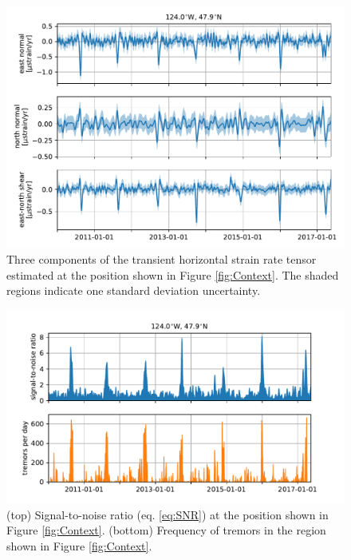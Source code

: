 \documentclass[10pt,letter]{article}
\begin{document}
\begin{figure}
\includegraphics{figures/strain_ts/strain-ts.pdf}
\caption{Three components of the transient horizontal strain rate tensor estimated at the position shown in Figure \ref{fig:Context}. The shaded regions indicate one standard deviation uncertainty.}   
\label{fig:StrainTs}
\end{figure}

\begin{figure}
\includegraphics{figures/strain_ts/mag-ts.pdf}
\caption{(top) Signal-to-noise ratio (eq. \ref{eq:SNR}) at the position shown in Figure \ref{fig:Context}. (bottom) Frequency of tremors in the region shown in Figure \ref{fig:Context}.}   
\label{fig:StrainMag}
\end{figure}
\end{document}
